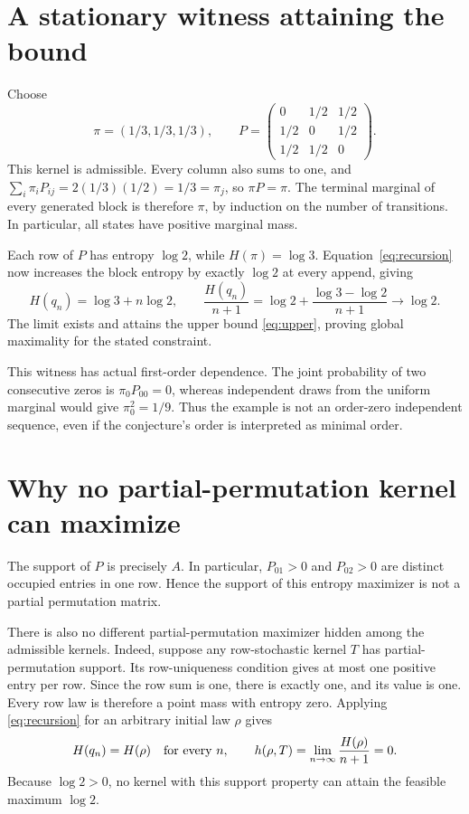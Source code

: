 \documentclass[10pt]{article}
\begin{document}
\section{A stationary witness attaining the bound}
Choose
\[
 \pi=(1/3,1/3,1/3),\qquad
 P=\begin{pmatrix}
 0&1/2&1/2\\1/2&0&1/2\\1/2&1/2&0
 \end{pmatrix}.
\]
This kernel is admissible. Every column also sums to one, and
$\sum_i\pi_iP_{ij}=2(1/3)(1/2)=1/3=\pi_j$, so $\pi P=\pi$. The terminal marginal of every generated block is therefore $\pi$, by induction on the number of transitions. In particular, all states have positive marginal mass.

Each row of $P$ has entropy $\log2$, while $H(\pi)=\log3$. Equation~\eqref{eq:recursion} now increases the block entropy by exactly $\log2$ at every append, giving
\begin{equation}\label{eq:witness}
 H(q_n)=\log3+n\log2,\qquad
 \frac{H(q_n)}{n+1}=\log2+\frac{\log3-\log2}{n+1}\longrightarrow\log2.
\end{equation}
The limit exists and attains the upper bound \eqref{eq:upper}, proving global maximality for the stated constraint.

This witness has actual first-order dependence. The joint probability of two consecutive zeros is $\pi_0P_{00}=0$, whereas independent draws from the uniform marginal would give $\pi_0^2=1/9$. Thus the example is not an order-zero independent sequence, even if the conjecture's order is interpreted as minimal order.

\section{Why no partial-permutation kernel can maximize}
The support of $P$ is precisely $A$. In particular, $P_{01}>0$ and $P_{02}>0$ are distinct occupied entries in one row. Hence the support of this entropy maximizer is not a partial permutation matrix.

There is also no different partial-permutation maximizer hidden among the admissible kernels. Indeed, suppose any row-stochastic kernel $T$ has partial-permutation support. Its row-uniqueness condition gives at most one positive entry per row. Since the row sum is one, there is exactly one, and its value is one. Every row law is therefore a point mass with entropy zero. Applying \eqref{eq:recursion} for an arbitrary initial law $\rho$ gives
\[
 H(q_n)=H(\rho)\quad\hbox{for every }n,\qquad
 h(\rho,T)=\lim_{n\to\infty}\frac{H(\rho)}{n+1}=0.
\]
Because $\log2>0$, no kernel with this support property can attain the feasible maximum $\log2$.
\end{document}
